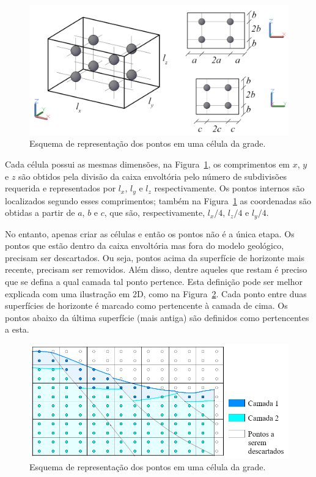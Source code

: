 \begin{figure} [H]
  \begin{center}
    \includegraphics[width=\textwidth]{images/fig-vol-cell}
    \caption{Esquema de representação dos pontos em uma célula da grade.}\label{fig-vol-cell}
  \end{center}
\end{figure}

Cada célula possui as mesmas dimensões, na Figura~\ref{fig-vol-cell}, os comprimentos em $x$, $y$ e $z$ são obtidos pela divisão da caixa envoltória pelo número de subdivisões requerida e representados por $l_x$, $l_y$ e $l_z$ respectivamente. Os pontos internos são localizados segundo esses comprimentos; também na Figura~\ref{fig-vol-cell} as coordenadas são obtidas a partir de $a$, $b$ e $c$, que são, respectivamente, $l_x/4$, $l_z/4$ e $l_y/4$.

No entanto, apenas criar as células e então os pontos não é a única etapa. Os pontos que estão dentro da caixa envoltória mas fora do modelo geológico, precisam ser descartados. Ou seja, pontos acima da superfície de horizonte mais recente, precisam ser removidos. Além disso, dentre aqueles que restam é preciso que se defina a qual camada tal ponto pertence. Esta definição pode ser melhor explicada com uma ilustração em 2D, como na Figura~\ref{fig-vol-2d}. Cada ponto entre duas superfícies de horizonte é marcado como pertencente à camada de cima. Os pontos abaixo da última superfície (mais antiga) são definidos como pertencentes a esta.

\begin{figure} [H]
  \begin{center}
    \includegraphics[width=\textwidth]{images/fig-vol-2d}
    \caption{Esquema de representação dos pontos em uma célula da grade.}\label{fig-vol-2d}
  \end{center}
\end{figure}

